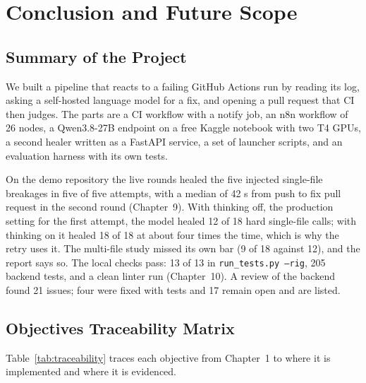 \chapter{Conclusion and Future Scope}

\section{Summary of the Project}
We built a pipeline that reacts to a failing GitHub Actions run by reading its log, asking a self-hosted language model for a fix, and opening a pull request that CI then judges. The parts are a CI workflow with a notify job, an n8n workflow of 26 nodes, a Qwen3.8-27B endpoint on a free Kaggle notebook with two T4 GPUs, a second healer written as a FastAPI service, a set of launcher scripts, and an evaluation harness with its own tests.

On the demo repository the live rounds healed the five injected single-file breakages in five of five attempts, with a median of 42 s from push to fix pull request in the second round (Chapter~9). With thinking off, the production setting for the first attempt, the model healed 12 of 18 hard single-file calls; with thinking on it healed 18 of 18 at about four times the time, which is why the retry uses it. The multi-file study missed its own bar (9 of 18 against 12), and the report says so. The local checks pass: 13 of 13 in \texttt{run\_tests.py --rig}, 205 backend tests, and a clean linter run (Chapter~10). A review of the backend found 21 issues; four were fixed with tests and 17 remain open and are listed.

\section{Objectives Traceability Matrix}
Table~\ref{tab:traceability} traces each objective from Chapter~1 to where it is implemented and where it is evidenced.

